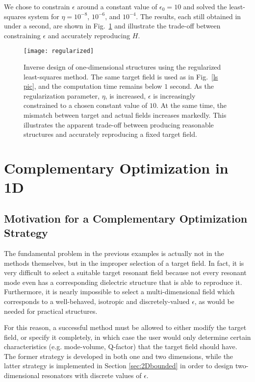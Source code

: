 \documentclass[10pt,letterpaper]{article}
\begin{document}
We chose to constrain $\epsilon$ around a constant value of $\epsilon_0 = 10$ and solved the least-squares system for $\eta=10^{-8}$, $10^{-6}$, and $10^{-4}$. The results, each still obtained in under a second, are shown in Fig.~\ref{regls pic} and illustrate the trade-off between constraining $\epsilon$ and accurately reproducing $H$.

\begin{figure}[htbp]\centering
\texttt{[image: regularized]}
\caption{Inverse design of one-dimensional structures using the regularized least-squares method. The same target field is used as in Fig.~\ref{ls pic}, and the computation time remains below $1$ second. As the regularization parameter, $\eta$, is increased, $\epsilon$ is increasingly constrained to a chosen constant value of $10$. At the same time, the mismatch between target and actual fields increases markedly. This illustrates the apparent trade-off between producing reasonable structures and accurately reproducing a fixed target field.}
\label{regls pic}
\end{figure}

\section{Complementary Optimization in 1D}
\subsection{Motivation for a Complementary Optimization Strategy}
The fundamental problem in the previous examples is actually not in the methods themselves, but in the improper selection of a target field. In fact, it is very difficult to select a suitable target resonant field because not every resonant mode even has a corresponding dielectric structure that is able to reproduce it. Furthermore, it is nearly impossible to select a multi-dimensional field which corresponds to a well-behaved, isotropic and discretely-valued $\epsilon$, as would be needed for practical structures. 

For this reason, a successful method must be allowed to either modify the target field, or specify it completely, in which case the user would only determine certain characteristics (e.g. mode-volume, Q-factor) that the target field should have. The former strategy is developed in both one and two dimensions, while the latter strategy is implemented in Section \ref{sec:2Dbounded} in order to design two-dimensional resonators with discrete values of $\epsilon$.
\end{document}
